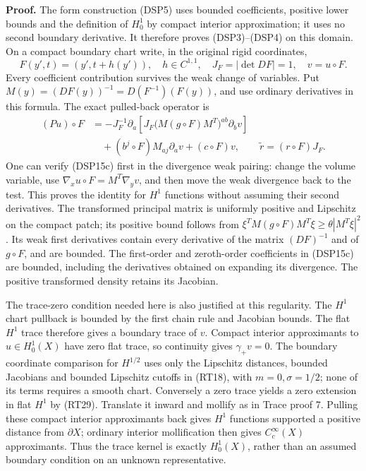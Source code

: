 \documentclass[
  11pt,
]{article}
\begin{document}
\textbf{Proof.} The form construction (DSP5) uses bounded coefficients,
positive lower bounds and the definition of \(H_0^1\) by compact
interior approximation; it uses no second boundary derivative. It
therefore proves (DSP3)--(DSP4) on this domain. On a compact boundary
chart write, in the original rigid coordinates, \[
 F(y',t)=(y',t+h(y')),\quad h\in C^{1,1},\quad
 J_F=|\det DF|=1,\quad v=u\circ F.
 \tag{DSP15b}
\] Every coefficient contribution survives the weak change of variables.
Put \(M(y)=(DF(y))^{-1}=D(F^{-1})(F(y))\), and use ordinary derivatives
in this formula. The exact pulled-back operator is \[
 \begin{split}
 (Pu)\circ F
 &=-J_F^{-1}\partial_a
   \left[J_F\bigl(M(g\circ F)M^T\bigr)^{ab}\partial_bv\right]\\
 &\quad +(b^j\circ F)M_{aj}\partial_av+(c\circ F)v,
 \qquad
 \widetilde r=(r\circ F)J_F .
 \end{split}
 \tag{DSP15c}
\] One can verify (DSP15c) first in the divergence weak pairing: change
the volume variable, use \(\nabla_xu\circ F=M^T\nabla_yv\), and then
move the weak divergence back to the test. This proves the identity for
\(H^1\) functions without assuming their second derivatives. The
transformed principal matrix is uniformly positive and Lipschitz on the
compact patch; its positive bound follows from
\(\xi^TM(g\circ F)M^T\xi\geq\theta|M^T\xi|^2\). Its weak first
derivatives contain every derivative of the matrix \((DF)^{-1}\) and of
\(g\circ F\), and are bounded. The first-order and zeroth-order
coefficients in (DSP15c) are bounded, including the derivatives obtained
on expanding its divergence. The positive transformed density retains
its Jacobian.

The trace-zero condition needed here is also justified at this
regularity. The \(H^1\) chart pullback is bounded by the first chain
rule and Jacobian bounds. The flat \(H^1\) trace therefore gives a
boundary trace of \(v\). Compact interior approximants to
\(u\in H_0^1(X)\) have zero flat trace, so continuity gives
\(\gamma_+v=0\). The boundary coordinate comparison for \(H^{1/2}\) uses
only the Lipschitz distances, bounded Jacobians and bounded Lipschitz
cutoffs in (RT18), with \(m=0,\sigma=1/2\); none of its terms requires a
smooth chart. Conversely a zero trace yields a zero extension in flat
\(H^1\) by (RT29). Translate it inward and mollify as in Trace proof 7.
Pulling these compact interior approximants back gives \(H^1\) functions
supported a positive distance from \(\partial X\); ordinary interior
mollification then gives \(C_c^\infty(X)\) approximants. Thus the trace
kernel is exactly \(H_0^1(X)\), rather than an assumed boundary
condition on an unknown representative.
\end{document}

